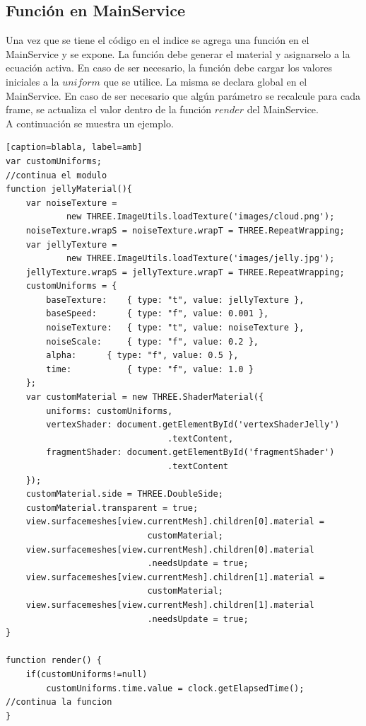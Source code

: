 \documentclass[12pt]{article}
\begin{document}
\subsection{Función en MainService}
Una vez que se tiene el código en el indice se agrega una función en el MainService y se expone. La función debe generar el material y asignarselo a la ecuación activa. En caso de ser necesario, la función debe cargar los valores iniciales a la $uniform$ que se utilice. La misma se declara global en el MainService. En caso de ser necesario que algún parámetro se recalcule para cada frame, se actualiza el valor dentro de la función $render$ del MainService.
\\A continuación se muestra un ejemplo.
\clearpage
\begin{lstlisting}[frame=single][caption=blabla, label=amb]
var customUniforms;
//continua el modulo
function jellyMaterial(){
	var noiseTexture = 
    		new THREE.ImageUtils.loadTexture('images/cloud.png');
	noiseTexture.wrapS = noiseTexture.wrapT = THREE.RepeatWrapping; 		
	var jellyTexture = 
    		new THREE.ImageUtils.loadTexture('images/jelly.jpg');
	jellyTexture.wrapS = jellyTexture.wrapT = THREE.RepeatWrapping; 
	customUniforms = {
		baseTexture: 	{ type: "t", value: jellyTexture },
		baseSpeed: 		{ type: "f", value: 0.001 },
		noiseTexture: 	{ type: "t", value: noiseTexture },
		noiseScale:		{ type: "f", value: 0.2 },
		alpha: 		{ type: "f", value: 0.5 },
		time: 			{ type: "f", value: 1.0 }
	};
	var customMaterial = new THREE.ShaderMaterial({
	    uniforms: customUniforms,
		vertexShader: document.getElementById('vertexShaderJelly')
        						.textContent,
		fragmentShader: document.getElementById('fragmentShader')
        						.textContent
	});
	customMaterial.side = THREE.DoubleSide;
	customMaterial.transparent = true;
	view.surfacemeshes[view.currentMesh].children[0].material = 
  							customMaterial;
	view.surfacemeshes[view.currentMesh].children[0].material
  							.needsUpdate = true;
	view.surfacemeshes[view.currentMesh].children[1].material = 
   							customMaterial;
	view.surfacemeshes[view.currentMesh].children[1].material
    						.needsUpdate = true;
}

function render() {
	if(customUniforms!=null)
		customUniforms.time.value = clock.getElapsedTime();
//continua la funcion
}
\end{lstlisting}
\clearpage
\end{document}
